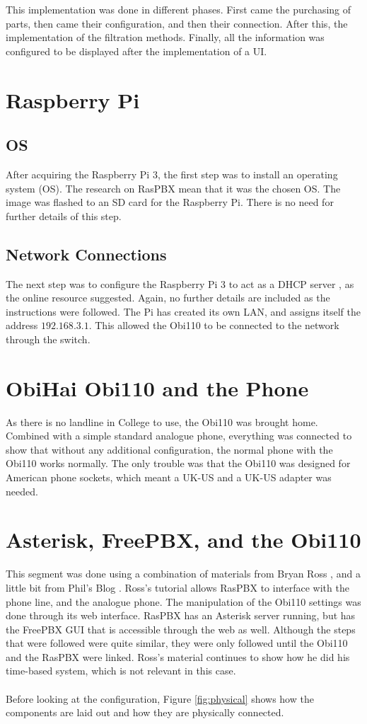 \documentclass[main.tex]{subfiles}
\begin{document}
This implementation was done in different phases. First came the purchasing of parts, then came their configuration, and then their connection. After this, the implementation of the filtration methods. Finally, all the information was configured to be displayed after the implementation of a UI.

\section{Raspberry Pi}
\subsection{OS}
After acquiring the Raspberry Pi 3, the first step was to install an operating system (OS). The research on RasPBX \cite{raspbx} mean that it was the chosen OS. The image was flashed to an SD card for the Raspberry Pi. There is no need for further details of this step.

\subsection{Network Connections}
The next step was to configure the Raspberry Pi 3 to act as a DHCP server \cite{pi-dhcp}, as the online resource suggested. Again, no further details are included as the instructions were followed. The Pi has created its own LAN, and assigns itself the address $192.168.3.1$. This allowed the Obi110 to be connected to the network through the switch.

\section{ObiHai Obi110 and the Phone}
As there is no landline in College to use, the Obi110 was brought home. Combined with a simple standard analogue phone, everything was connected to show that without any additional configuration, the normal phone with the Obi110 works normally. The only trouble was that the Obi110 was designed for American phone sockets, which meant a UK-US and a UK-US adapter was needed.

\section{Asterisk, FreePBX, and the Obi110}
This segment was done using a combination of materials from Bryan Ross \cite{bryanross}, and a little bit from Phil's Blog \cite{obihaiuk}. Ross's tutorial \cite{bryanross} allows RasPBX to interface with the phone line, and the analogue phone. The manipulation of the Obi110 settings was done through its web interface. RasPBX has an Asterisk server running, but has the FreePBX GUI that is accessible through the web as well. Although the steps that were followed were quite similar, they were only followed until the Obi110 and the RasPBX were linked. Ross's material continues to show how he did his time-based system, which is not relevant in this case.
\\\\
Before looking at the configuration, Figure \ref{fig:physical} shows how the components are laid out and how they are physically connected.
\end{document}
